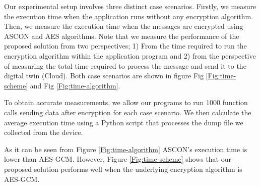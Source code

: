 Our experimental setup involves three distinct case scenarios. Firstly, we measure the execution time when the application runs without any encryption algorithm. Then, we measure the execution time when the messages are encrypted using ASCON and AES algorithms. Note that we measure the performance of the proposed solution from two perspectives; 1) From the time required to run the encryption algorithm within the application program and 2) from the perspective of measuring the total time required to process the message and send it to the digital twin (Cloud). Both case scenarios are shown in figure Fig \ref{Fig:time-scheme} and Fig \ref{Fig:time-algorithm}. 

To obtain accurate measurements, we allow our programs to run 1000 function calls sending data after encryption for each case scenario. We then calculate the average execution time using a Python script that processes the dump file we collected from the device.

As it can be seen from Figure \ref{Fig:time-algorithm} ASCON's execution time is lower than AES-GCM. However, Figure \ref{Fig:time-scheme} shows that our proposed solution performs well when the underlying encryption algorithm is AES-GCM.

